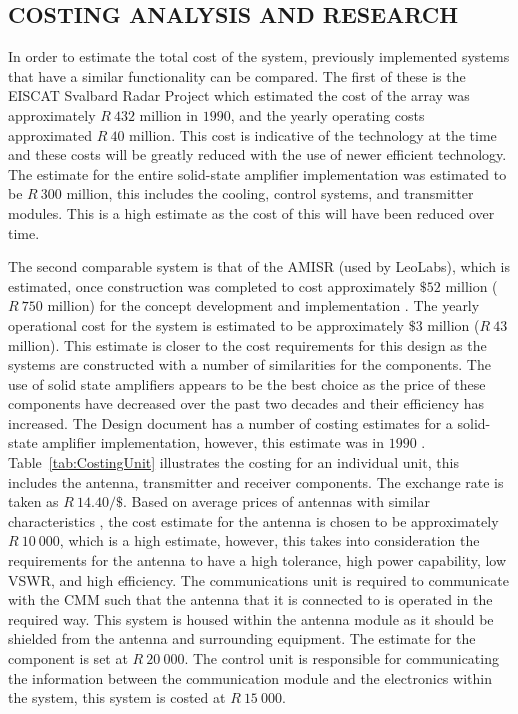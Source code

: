 \documentclass[11pt]{witseiepaper}
\begin{document}
\begin{bibunit}[witseie]
\section{COSTING ANALYSIS AND RESEARCH} \label{sec:CostingAnalysisandResearch}

In order to estimate the total cost of the system, previously implemented systems that have a similar functionality can be compared. The first of these is the EISCAT Svalbard Radar Project \cite[p.~670]{EISCATPrice} which estimated the cost of the array was approximately $R~432$ million in $1990$, and the yearly operating costs approximated $R~40$ million. This cost is indicative of the technology at the time and these costs will be greatly reduced with the use of newer efficient technology.
The estimate for the entire solid-state amplifier implementation was estimated to be $R~300$ million, this includes the cooling, control systems, and transmitter modules. This is a high estimate as the cost of this will have been reduced over time.

The second comparable system is that of the AMISR (used by LeoLabs), which is estimated, once construction was completed to cost approximately $\$52$ million ($R~750$ million) for the concept development and implementation \cite[p.~333-337]{AMISRCosting}. The yearly operational cost for the system is estimated to be approximately $\$3$ million ($R~43$ million). This estimate is closer to the cost requirements for this design as the systems are constructed with a number of similarities for the components.
The use of solid state amplifiers appears to be the best choice as the price of these components have decreased over the past two decades and their efficiency has increased.
The Design document has a number of costing estimates for a solid-state amplifier implementation, however, this estimate was in $1990$ \cite[p.~37]{DesignDraft}.
Table~\ref{tab:CostingUnit} illustrates the costing for an individual unit, this includes the antenna, transmitter and receiver components. The exchange rate is taken as $R~14.40/\$$.
Based on average prices of antennas with similar characteristics \cite{AntennaPrice1,AntennaPrice2,AntennaPrice3,AntennaPrice4,AntennaPrice5}, the cost estimate for the antenna is chosen to be approximately $R~10~000$, which is a high estimate, however, this takes into consideration the requirements for the antenna to have a high tolerance, high power capability, low VSWR, and high efficiency. The communications unit is required to communicate with the CMM such that the antenna that it is connected to is operated in the required way. This system is housed within the antenna module as it should be shielded from the antenna and surrounding equipment. The estimate for the component is set at $R~20~000$. The control unit is responsible for communicating the information between the communication module and the electronics within the system, this system is costed at $R~15~000$.


\end{bibunit}
\end{document}
